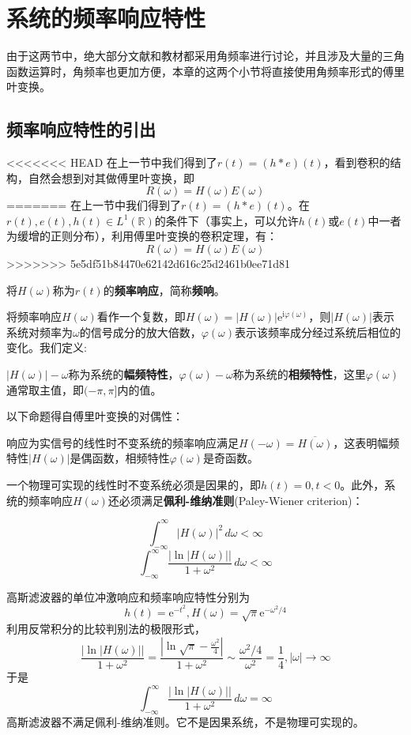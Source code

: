 \section{系统的频率响应特性}\label{sec:Freq_Response}

由于这两节中，绝大部分文献和教材都采用角频率进行讨论，并且涉及大量的三角函数运算时，角频率也更加方便，本章的这两个小节将直接使用角频率形式的傅里叶变换。

\subsection{频率响应特性的引出}\label{sub:freq_response}
<<<<<<< HEAD
在上一节中我们得到了$r(t)=(h*e)(t)$，看到卷积的结构，自然会想到对其做傅里叶变换，即\[R(\omega)=H(\omega)E(\omega)\]
=======
在上一节中我们得到了$r(t)=(h*e)(t)$。在$r(t),e(t),h(t)\in L^1(\mathbb{R})$的条件下（事实上，可以允许$h(t)$或$e(t)$中一者为缓增的正则分布），利用傅里叶变换的卷积定理，有：
\[R(\omega)=H(\omega)E(\omega)\]
>>>>>>> 5e5df51b84470e62142d616c25d2461b0ee71d81
\begin{definition}[频率响应]
    将$H(\omega)$称为$r(t)$的\textbf{频率响应}，简称\textbf{频响}。
\end{definition}

将频率响应$H(\omega)$看作一个复数，即$H(\omega)=|H(\omega)|\mathrm{e}^{\mathrm{i}\varphi(\omega)}$，则$|H(\omega)|$表示系统对频率为$\omega$的信号成分的放大倍数，$\varphi(\omega)$表示该频率成分经过系统后相位的变化。我们定义:
\begin{definition}[幅频特性和相频特性]
    $|H(\omega)|-\omega$称为系统的\textbf{幅频特性}，$\varphi(\omega)-\omega$称为系统的\textbf{相频特性}，这里$\varphi(\omega)$通常取主值，即$(-\pi,\pi]$内的值。
\end{definition}

以下命题得自傅里叶变换的对偶性：
\begin{proposition}
    响应为实信号的线性时不变系统的频率响应满足$H(-\omega)=\overline{H(\omega)}$，这表明幅频特性$|H(\omega)|$是偶函数，相频特性$\varphi(\omega)$是奇函数。
\end{proposition}

一个物理可实现的线性时不变系统必须是因果的，即$h(t)=0,t<0$。此外，系统的频率响应$H(\omega)$还必须满足\textbf{佩利-维纳准则}(Paley-Wiener criterion)\cite{signal_systems}：
\begin{definition}[佩利-维纳准则]
    \[\int_{-\infty}^{\infty}\left|H(\omega)\right|^2\,d\omega<\infty\]
    \[\int_{-\infty}^{\infty}\frac{\left|\ln|H(\omega)|\right|}{1+\omega^2}\,d\omega<\infty\]
\end{definition}
\begin{example}
    高斯滤波器的单位冲激响应和频率响应特性分别为
    $$h(t)=\mathrm{e}^{-t^2},H(\omega)=\sqrt{\pi}\mathrm{e}^{-\omega^2/4}$$
    利用反常积分的比较判别法的极限形式，
    \[\frac{|\ln|H(\omega)||}{1+\omega^2}=\frac{\left|\ln \sqrt{\pi}-\frac{\omega^2}{4}\right|}{1+\omega^2}\sim \frac{\omega^2/4}{\omega^2}=\frac{1}{4},|\omega|\to\infty\]
    于是
    \[\int_{-\infty}^{\infty}\frac{\left|\ln|H(\omega)|\right|}{1+\omega^2}\,d\omega=\infty\]
    高斯滤波器不满足佩利-维纳准则。它不是因果系统，不是物理可实现的。
\end{example}

